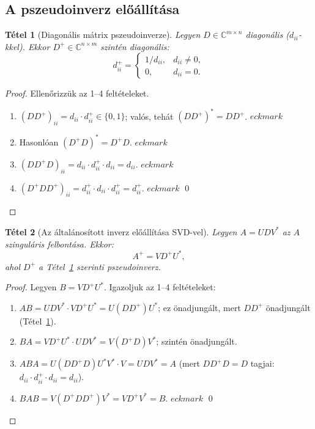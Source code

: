 \documentclass[a4paper,12pt]{article}
\theoremstyle{mydef}
\newtheorem{tetel}{Tétel}[section]
\newcommand{\C}{\mathbb{C}}
\begin{document}
\subsection*{A pszeudoinverz előállítása}

\begin{mdframed}[backgroundcolor=thmbg,linewidth=0pt,innertopmargin=8pt,innerbottommargin=8pt]
\begin{tetel}[Diagonális mátrix pszeudoinverze]
\label{tetel:diagpseudo}
Legyen $D \in \C^{m\times n}$ diagonális ($d_{ii}$-kkel). Ekkor $D^+ \in \C^{n\times m}$
szintén diagonális:
\[
  d_{ii}^+ = \begin{cases} 1/d_{ii}, & d_{ii} \ne 0, \\ 0, & d_{ii} = 0. \end{cases}
\]
\end{tetel}
\end{mdframed}

\begin{proof}
Ellenőrizzük az 1--4 feltételeket.
\begin{enumerate}[noitemsep,topsep=2pt]
  \item $(DD^+)_{ii} = d_{ii}\cdot d_{ii}^+ \in \{0, 1\}$; valós, tehát $(DD^+)^* = DD^+$. $eckmark$
  \item Hasonlóan $(D^+D)^* = D^+D$. $eckmark$
  \item $(DD^+D)_{ii} = d_{ii}\cdot d_{ii}^+\cdot d_{ii} = d_{ii}$. $eckmark$
  \item $(D^+DD^+)_{ii} = d_{ii}^+\cdot d_{ii}\cdot d_{ii}^+ = d_{ii}^+$. $eckmark$ \qed
\end{enumerate}
\end{proof}

\begin{mdframed}[backgroundcolor=thmbg,linewidth=0pt,innertopmargin=8pt,innerbottommargin=8pt]
\begin{tetel}[Az általánosított inverz előállítása SVD-vel]
\label{tetel:pseudosvd}
Legyen $A = UDV^*$ az $A$ szinguláris felbontása. Ekkor:
\[
  A^+ = V D^+ U^*,
\]
ahol $D^+$ a Tétel~\ref{tetel:diagpseudo} szerinti pszeudoinverz.
\end{tetel}
\end{mdframed}

\begin{proof}
Legyen $B = VD^+U^*$. Igazoljuk az 1--4 feltételeket:
\begin{enumerate}[noitemsep,topsep=2pt]
  \item $AB = UDV^*\cdot VD^+U^* = U(DD^+)U^*$; ez önadjungált, mert $DD^+$ önadjungált
        (Tétel~\ref{tetel:diagpseudo}).
  \item $BA = VD^+U^*\cdot UDV^* = V(D^+D)V^*$; szintén önadjungált.
  \item $ABA = U(DD^+D)U^*V^* \cdot V = UDV^* = A$ (mert $DD^+D = D$ tagjai: $d_{ii}\cdot d_{ii}^+\cdot d_{ii} = d_{ii}$).
  \item $BAB = V(D^+DD^+)V^* = VD^+V^* = B$. $eckmark$ \qed
\end{enumerate}
\end{proof}
\end{document}

